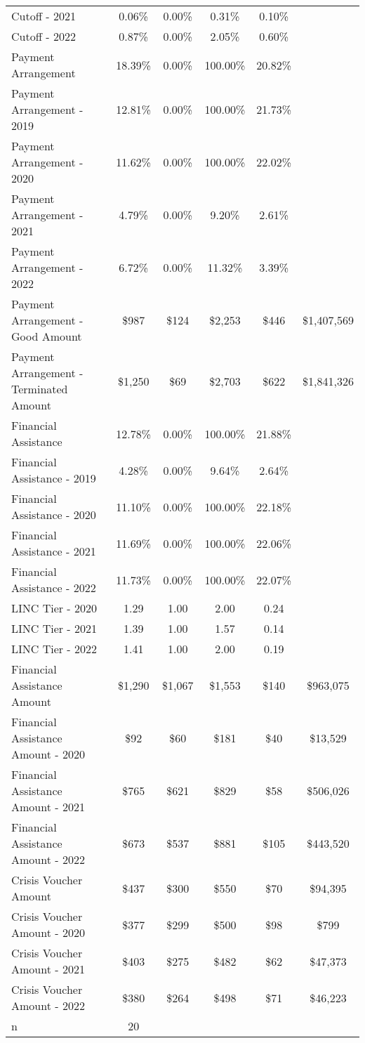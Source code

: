 \begin{tabular}{l|c|c|c|c|c}
\quad Cutoff - 2021 & 0.06\% & 0.00\% & 0.31\% & 0.10\% \\
\quad Cutoff - 2022 & 0.87\% & 0.00\% & 2.05\% & 0.60\% \\
\midrule 
Payment Arrangement & 18.39\% & 0.00\% & 100.00\% & 20.82\% \\
\quad Payment Arrangement - 2019 & 12.81\% & 0.00\% & 100.00\% & 21.73\% \\
\quad Payment Arrangement - 2020 & 11.62\% & 0.00\% & 100.00\% & 22.02\% \\
\quad Payment Arrangement - 2021 & 4.79\% & 0.00\% & 9.20\% & 2.61\% \\
\quad Payment Arrangement - 2022 & 6.72\% & 0.00\% & 11.32\% & 3.39\% \\
\quad Payment Arrangement - Good Amount & \$987 & \$124 & \$2,253 & \$446 & \$1,407,569 \\
\quad Payment Arrangement - Terminated Amount & \$1,250 & \$69 & \$2,703 & \$622 & \$1,841,326 \\
\midrule 
Financial Assistance & 12.78\% & 0.00\% & 100.00\% & 21.88\% \\
\quad Financial Assistance - 2019 & 4.28\% & 0.00\% & 9.64\% & 2.64\% \\
\quad Financial Assistance - 2020 & 11.10\% & 0.00\% & 100.00\% & 22.18\% \\
\quad Financial Assistance - 2021 & 11.69\% & 0.00\% & 100.00\% & 22.06\% \\
\quad Financial Assistance - 2022 & 11.73\% & 0.00\% & 100.00\% & 22.07\% \\
\midrule 
LINC Tier - 2020 & 1.29 & 1.00 & 2.00 & 0.24 \\
LINC Tier - 2021 & 1.39 & 1.00 & 1.57 & 0.14 \\
LINC Tier - 2022 & 1.41 & 1.00 & 2.00 & 0.19 \\
\midrule 
Financial Assistance Amount & \$1,290 & \$1,067 & \$1,553 & \$140 & \$963,075 \\
\quad Financial Assistance Amount - 2020 & \$92 & \$60 & \$181 & \$40 & \$13,529 \\
\quad Financial Assistance Amount - 2021 & \$765 & \$621 & \$829 & \$58 & \$506,026 \\
\quad Financial Assistance Amount - 2022 & \$673 & \$537 & \$881 & \$105 & \$443,520 \\
\midrule 
Crisis Voucher Amount & \$437 & \$300 & \$550 & \$70 & \$94,395 \\
\quad Crisis Voucher Amount - 2020 & \$377 & \$299 & \$500 & \$98 & \$799 \\
\quad Crisis Voucher Amount - 2021 & \$403 & \$275 & \$482 & \$62 & \$47,373 \\
\quad Crisis Voucher Amount - 2022 & \$380 & \$264 & \$498 & \$71 & \$46,223 \\
\midrule 
n & 20 &  &  &  &  \\
\midrule 
\bottomrule 
\end{tabular}
